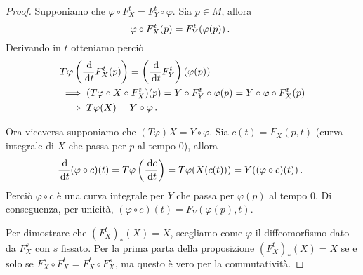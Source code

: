 \begin{proof}
	Supponiamo che $\varphi\circ F_X^t=F_Y^t\circ \varphi$. Sia $p\in M$, allora
	\begin{equation*}
		\varphi\circ F_X^t(p)=F_Y^t(\varphi(p))\, \text{. }
	\end{equation*}
	Derivando in $t$ otteniamo perciò
	\begin{align*}
		&T\varphi\left(\frac{\,\mathrm d}{\,\mathrm d t}F_X^t(p)\right)=\left(\frac{\,\mathrm d}{\,\mathrm d t}F_Y^t\right)(\varphi(p))\\
		&\implies (T\varphi\circ X\circ F_X^t)(p) = Y \circ F_Y^t \circ \varphi(p) = Y\circ \varphi \circ F_X^t(p) \\
		&\implies T\varphi (X)=Y\circ \varphi\, \text{. }
	\end{align*}
	
	Ora viceversa supponiamo che $(T\varphi)X=Y\circ\varphi$. Sia $c(t)=F_X(p,t)$ (curva integrale di $X$ che passa per $p$ al tempo 0), allora
	\begin{equation*}
		\frac {\,\mathrm d}{\,\mathrm d t}(\varphi\circ c)(t) = T\varphi \left(\frac{\,\mathrm d c}{\,\mathrm d t}\right) = T\varphi(X(c(t))) = Y((\varphi\circ c)(t))\, \text{. }
	\end{equation*}
	Perciò $\varphi\circ c$ è una curva integrale per $Y$ che passa per $\varphi(p)$ al tempo 0. Di conseguenza, per unicità, $(\varphi \circ c)(t) = F_Y(\varphi(p),t)$.
	
	Per dimostrare che $(F_X^t)_*(X)=X$, scegliamo come $\varphi$ il diffeomorfismo dato da $F_X^s$ con $s$ fissato. Per la prima parta della proposizione $(F_X^t)_*(X)=X$ se e solo se $F_X^s\circ F_X^t=F_X^t\circ F_X^s$, ma questo è vero per la commutatività.
\end{proof}






